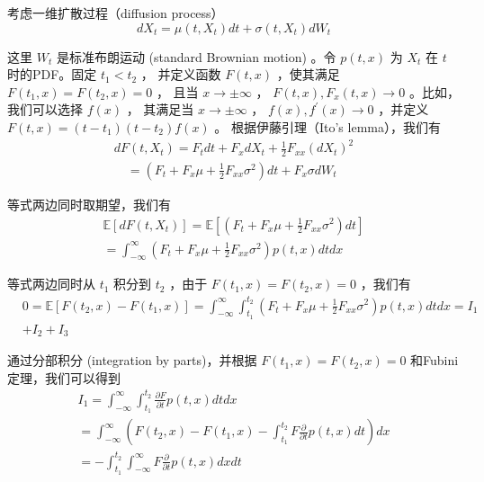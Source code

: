\documentclass[lang=cn,newtx,10pt,scheme=chinese]{elegantbook}
\begin{document}
考虑一维扩散过程（diffusion process）
$$
d X_t=\mu\left(t, X_t\right) d t+\sigma\left(t, X_t\right) d W_t
$$

这里 $W_t$ 是标准布朗运动 (standard Brownian motion) 。令 $p(t, x)$ 为 $X_t$ 在 $t$ 时的PDF。固定 $t_1<t_2$ ，
并定义函数 $F(t, x)$ ，使其满足 $F\left(t_1, x\right)=F\left(t_2, x\right)=0$ ，
且当 $x \rightarrow \pm \infty$ ， $F(t, x), F_x(t, x) \rightarrow 0$ 。比如，我们可以选择 $f(x)$ ，
其满足当 $x \rightarrow \pm \infty$ ，
$f(x), f^{\prime}(x) \rightarrow 0$ ，并定义 $F(t, x)=\left(t-t_1\right)\left(t-t_2\right) f(x)$ 。
根据伊藤引理（Ito's lemma），我们有
$$
\begin{gathered}
d F\left(t, X_t\right)=F_t d t+F_x d X_t+\frac{1}{2} F_{x x}\left(d X_t\right)^2 \\
\quad=\left(F_t+F_x \mu+\frac{1}{2} F_{x x} \sigma^2\right) d t+F_x \sigma d W_t
\end{gathered}
$$

等式两边同时取期望，我们有
$$
\begin{gathered}
\mathbb{E}\left[d F\left(t, X_t\right)\right]=\mathbb{E}\left[\left(F_t+F_x \mu+\frac{1}{2} F_{x x} \sigma^2\right) d t\right] \\
=\int_{-\infty}^{\infty}\left(F_t+F_x \mu+\frac{1}{2} F_{x x} \sigma^2\right) p(t, x) d t d x
\end{gathered}
$$

等式两边同时从 $t_1$ 积分到 $t_2$ ，由于 $F\left(t_1, x\right)=F\left(t_2, x\right)=0$ ，我们有
$$
\begin{aligned}
& 0=\mathbb{E}\left[F\left(t_2, x\right)-F\left(t_1, x\right)\right]=\int_{-\infty}^{\infty} 
\int_{t_1}^{t_2}\left(F_t+F_x \mu+\frac{1}{2} F_{x x} \sigma^2\right) p(t, x) d t d x=I_1 \\
& +I_2+I_3
\end{aligned}
$$

通过分部积分 (integration by parts)，并根据 $F\left(t_1, x\right)=F\left(t_2, x\right)=0$ 和Fubini定理，我们可以得到
$$
\begin{gathered}
I_1=\int_{-\infty}^{\infty} \int_{t_1}^{t_2} \frac{\partial F}{\partial t} p(t, x) d t d x \\
=\int_{-\infty}^{\infty}\left(F\left(t_2, x\right)-F\left(t_1, x\right)-\int_{t_1}^{t_2} F 
\frac{\partial}{\partial t} p(t, x) d t\right) d x \\
=-\int_{t_1}^{t_2} \int_{-\infty}^{\infty} F \frac{\partial}{\partial t} p(t, x) d x d t
\end{gathered}
$$
\end{document}
